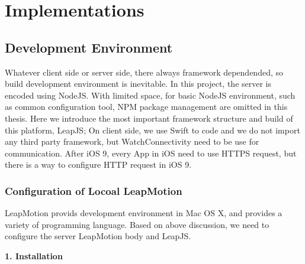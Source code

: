 \chapter{Implementations}

\section{Development Environment}

Whatever client side or server side, there always framework dependended, so build development environment is inevitable. In this project, the server is encoded using NodeJS. With limited space, for basic NodeJS environment, such as common configuration tool, NPM package management are omitted in this thesis. Here we introduce the most important framework structure and build of this platform, LeapJS; On client side, we use Swift to code and we do not import any third party framework, but WatchConnectivity need to be use for communication\cite{WatchConnectivity:2016}.
After iOS 9, every App in iOS need to use HTTPS request, but there is a way to configure HTTP request in iOS 9.

\subsection{Configuration of Locoal LeapMotion}

LeapMotion provids development environment in Mac OS X, and provides a variety of programming language. Based on above discussion, we need to configure the server LeapMotion body and LeapJS.

\textbf{1. Installation}

